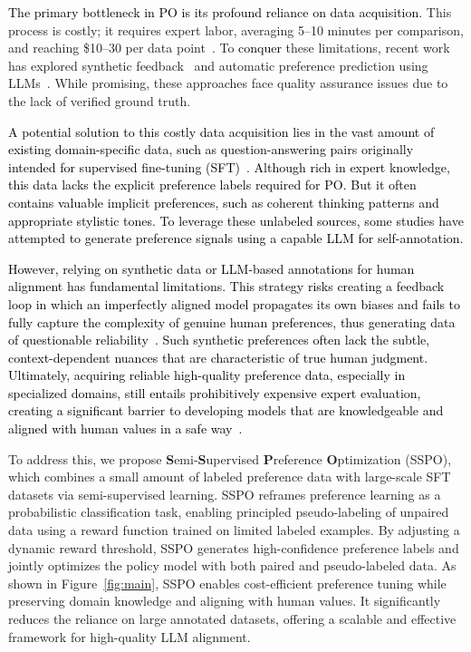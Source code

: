 \documentclass{article} %
\newcommand\fix[1]{\textcolor{black}{#1}}
\newcommand\turnitin[1]{\textcolor{black}{#1}}
\begin{document}
\fix{The primary bottleneck in PO is its profound reliance on data acquisition.} This process is costly; it requires expert labor, averaging 5–10 minutes per comparison, and reaching \$10–30 per data point~\citep{bai2022traininghelpfulharmlessassistant, casper2023open}. To \turnitin{conquer} these limitations, recent work has explored synthetic feedback~\citep{huang-etal-2023-learning-preference, zhou2024anyprefer, xu2024dr} and automatic preference prediction using LLMs~\citep{he-etal-2024-semi-supervised}. While promising, these approaches face quality assurance issues due to the lack of verified ground truth.




\fix{A potential solution to this costly data acquisition lies in the vast amount of existing domain-specific data, such as question-answering pairs originally intended for supervised fine-tuning (SFT)~\citep{agrawal2024modeling}. Although rich in expert knowledge, this data lacks the explicit preference labels required for PO. But it often contains valuable implicit preferences, such as coherent thinking patterns and appropriate stylistic tones. To leverage these unlabeled sources, some studies have attempted to generate preference signals using a capable LLM for self-annotation.}

\fix{However, relying on synthetic data or LLM-based annotations for human alignment has fundamental limitations. This strategy risks creating a feedback loop in which an imperfectly aligned model propagates its own biases and fails to fully capture the complexity of genuine human preferences, thus generating data of questionable reliability~\citep{casper2023open}. Such synthetic preferences often lack the subtle, context-dependent nuances that are characteristic of true human judgment. Ultimately, acquiring reliable high-quality preference data, especially in specialized domains, still entails prohibitively expensive expert evaluation, creating a significant barrier to developing models that are knowledgeable and aligned with human values in a safe way~\citep{miller2024ai}.}



To address this, we propose \textbf{S}emi-\textbf{S}upervised \textbf{P}reference \textbf{O}ptimization (SSPO), which combines a small amount of labeled preference data with large-scale SFT datasets via semi-supervised learning. SSPO reframes preference learning as a probabilistic classification task, enabling principled pseudo-labeling of unpaired data using a reward function trained on limited labeled examples. By adjusting a dynamic reward threshold, SSPO generates high-confidence preference labels and jointly optimizes the policy model with both paired and pseudo-labeled data. As shown in Figure~\ref{fig:main}, SSPO enables cost-efficient preference tuning while preserving domain knowledge and aligning with human values. It significantly reduces the reliance on large annotated datasets, offering a scalable and effective framework for high-quality LLM alignment.
\end{document}
